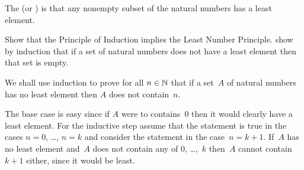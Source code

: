 \documentclass{ibl}  %
\begin{document}
\begin{df}
The  
(or )
is that any nonempty 
subset of the natural
numbers has a least element.  
\end{df}

\begin{ex}
Show that the Principle of Induction implies the Least Number 
Principle.
\hint
show by induction that if a set of natural numbers does not
have a least element then that set is empty.
\begin{ans}
We shall use induction to prove for all $n\in\mathbb{N}$ that if a set~$A$ 
of natural numbers has no
least element then $A$ does not contain~$n$.

The base case is easy since if $A$ were to contains~$0$ then it would
clearly have a least element.
For the inductive step assume that the statement is true in the cases
$n=0$, \ldots, $n=k$ and consider the statement in the case~$n=k+1$.
If~$A$ has no least element and~$A$ does not contain any of $0$, \ldots,~$k$ 
then~$A$ cannot contain~$k+1$ either, since it would be least.   
\end{ans}
\end{ex}





\end{document}
